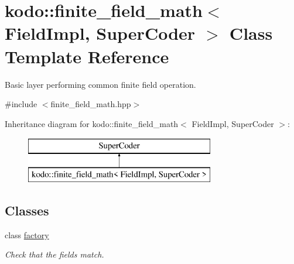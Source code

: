 \hypertarget{classkodo_1_1finite__field__math}{\section{kodo\-:\-:finite\-\_\-field\-\_\-math$<$ Field\-Impl, Super\-Coder $>$ Class Template Reference}
\label{classkodo_1_1finite__field__math}
}


Basic layer performing common finite field operation.  




{\ttfamily \#include $<$finite\-\_\-field\-\_\-math.\-hpp$>$}

Inheritance diagram for kodo\-:\-:finite\-\_\-field\-\_\-math$<$ Field\-Impl, Super\-Coder $>$\-:\begin{figure}[H]
\begin{center}
\leavevmode
\includegraphics[height=2.000000cm]{classkodo_1_1finite__field__math}
\end{center}
\end{figure}
\subsection*{Classes}
\begin{DoxyCompactItemize}
\item 
class \hyperlink{classkodo_1_1finite__field__math_1_1factory}{factory}
\begin{DoxyCompactList}\small\item\em Check that the fields match. \end{DoxyCompactList}\end{DoxyCompactItemize}
